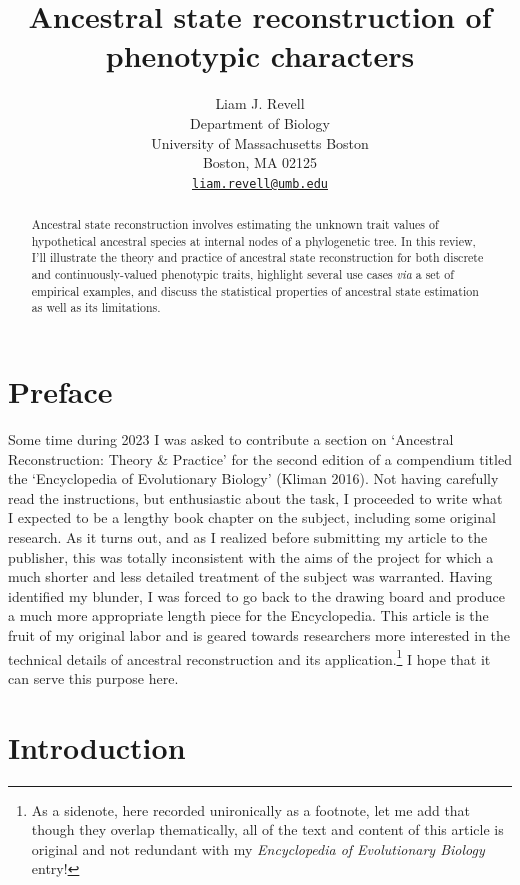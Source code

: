 \documentclass{article}
\title{Ancestral state reconstruction of phenotypic characters}
\author{
    Liam J. Revell
   \\
    Department of Biology \\
    University of Massachusetts Boston \\
  Boston, MA 02125 \\
  \texttt{\href{mailto:liam.revell@umb.edu}{\nolinkurl{liam.revell@umb.edu}}} \\
  }
\begin{document}
\maketitle


\begin{abstract}
Ancestral state reconstruction involves estimating the unknown trait values of hypothetical ancestral species at internal nodes of a phylogenetic tree. In this review, I'll illustrate the theory and practice of ancestral state reconstruction for both discrete and continuously-valued phenotypic traits, highlight several use cases \emph{via} a set of empirical examples, and discuss the statistical properties of ancestral state estimation as well as its limitations.
\end{abstract}


\section{Preface}\label{preface}

Some time during 2023 I was asked to contribute a section on `Ancestral Reconstruction: Theory \& Practice' for the second edition of a compendium titled the `Encyclopedia of Evolutionary Biology' (Kliman 2016). Not having carefully read the instructions, but enthusiastic about the task, I proceeded to write what I expected to be a lengthy book chapter on the subject, including some original research. As it turns out, and as I realized before submitting my article to the publisher, this was totally inconsistent with the aims of the project for which a much shorter and less detailed treatment of the subject was warranted. Having identified my blunder, I was forced to go back to the drawing board and produce a much more appropriate length piece for the Encyclopedia. This article is the fruit of my original labor and is geared towards researchers more interested in the technical details of ancestral reconstruction and its application.\footnote{As a sidenote, here recorded unironically as a footnote, let me add that though they overlap thematically, all of the text and content of this article is original and not redundant with my \emph{Encyclopedia of Evolutionary Biology} entry!} I hope that it can serve this purpose here.

\section{Introduction}\label{introduction}
\end{document}
